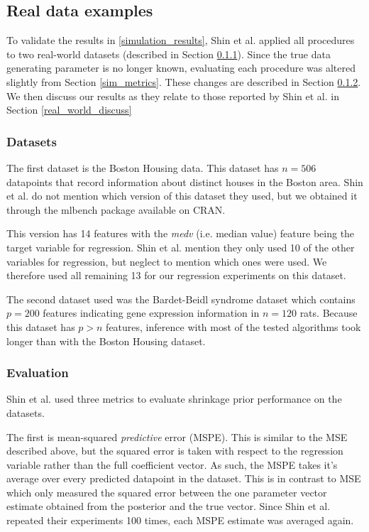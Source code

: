 







\subsection{Real data examples}
To validate the results in \ref{simulation_results}, Shin et al. applied all procedures to two real-world datasets (described in Section \ref{real_world_datasets}).
Since the true data generating parameter is no longer known, evaluating each procedure was altered slightly from Section \ref{sim_metrics}.
These changes are described in Section \ref{real_world_eval}.
We then discuss our results as they relate to those reported by Shin et al. in Section \ref{real_world_discuss}

\subsubsection{Datasets}
\label{real_world_datasets}
The first dataset is the Boston Housing data. 
This dataset has $n=506$ datapoints that record information about distinct houses in the Boston area.
Shin et al. do not mention which version of this dataset they used, but we obtained it through the mlbench package available on CRAN.

This version has 14 features with the \textit{medv} (i.e. median value) feature being the target variable for regression.
Shin et al. mention they only used 10 of the other variables for regression, but neglect to mention which ones were used.
We therefore used all remaining 13 for our regression experiments on this dataset.

The second dataset used was the Bardet-Beidl syndrome dataset which contains $p=200$ features indicating gene expression information in $n=120$ rats.
Because this dataset has $p>n$ features, inference with most of the tested algorithms took longer than with the Boston Housing dataset.

\subsubsection{Evaluation}
\label{real_world_eval}
Shin et al. used three metrics to evaluate shrinkage prior performance on the datasets.

The first is mean-squared \textit{predictive} error (MSPE).
This is similar to the MSE described above, but the squared error is taken with respect to the regression variable rather than the full coefficient vector. 
As such, the MSPE takes it's average over every predicted datapoint in the dataset.
This is in contrast to MSE which only measured the squared error between the one parameter vector estimate obtained from the posterior and the true vector.  
Since Shin et al. repeated their experiments 100 times, each MSPE estimate was averaged again.

